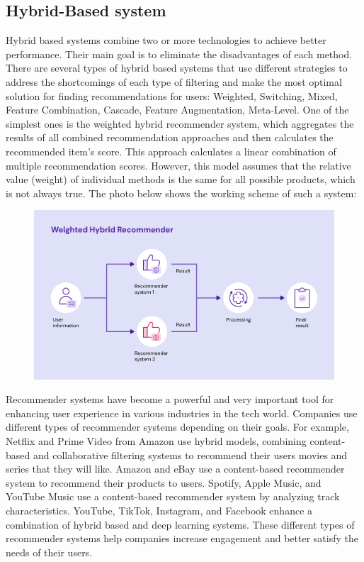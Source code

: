 \documentclass[12pt]{article}
\begin{document}
\subsection{Hybrid-Based system}

Hybrid based systems combine two or more technologies to achieve better performance. Their main goal is to eliminate the disadvantages of each method. There are several types of hybrid based systems that use different strategies to address the shortcomings of each type of filtering and make the most optimal solution for finding recommendations for users: Weighted, Switching, Mixed, Feature Combination, Cascade, Feature Augmentation, Meta-Level. One of the simplest ones is the weighted hybrid recommender system, which aggregates the results of all combined recommendation approaches and then calculates the recommended item’s score. This approach calculates a linear combination of multiple recommendation scores. However, this model assumes that the relative value (weight) of individual methods is the same for all possible products, which is not always true. The photo below shows the working scheme of such a system:

\begin{figure}[H]  %
    \centering     %
    \includegraphics[width=1\textwidth]{image1.png}
\end{figure}
\cite{2.3}
\vspace{1em}

Recommender systems have become a powerful and very important tool for enhancing user experience in various industries in the tech world. Companies use different types of recommender systems depending on their goals. For example, Netflix and Prime Video from Amazon use hybrid models, combining content-based and collaborative filtering systems to recommend their users movies and series that they will like. Amazon and eBay use a content-based recommender system to recommend their products to users. Spotify, Apple Music, and YouTube Music use a content-based recommender system by analyzing track characteristics. YouTube, TikTok, Instagram, and Facebook enhance a combination of hybrid based and deep learning systems. These different types of recommender systems help companies increase engagement and better satisfy the needs of their users.
\cite{2.4}
\end{document}
